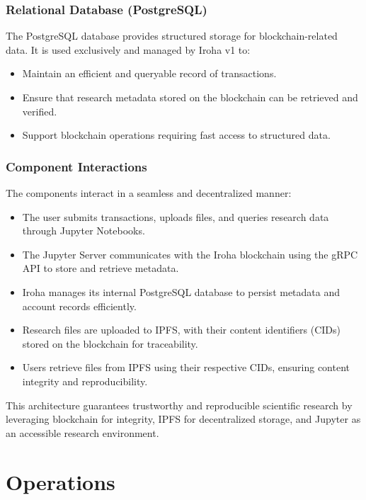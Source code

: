 \documentclass[final]{rc-book-2.14}
\begin{document}
\subsubsection{Relational Database (PostgreSQL)}
The PostgreSQL database provides structured storage for blockchain-related data. It is used exclusively and managed by Iroha v1 to:
\begin{itemize}
    \item Maintain an efficient and queryable record of transactions.
    \item Ensure that research metadata stored on the blockchain can be retrieved and verified.
    \item Support blockchain operations requiring fast access to structured data.
\end{itemize}


\subsubsection{Component Interactions}

The components interact in a seamless and decentralized manner:

\begin{itemize}
    \item The user submits transactions, uploads files, and queries research data through Jupyter Notebooks.
    \item The Jupyter Server communicates with the Iroha blockchain using the gRPC API to store and retrieve metadata.
    \item Iroha manages its internal PostgreSQL database to persist metadata and account records efficiently.
    \item Research files are uploaded to IPFS, with their content identifiers (CIDs) stored on the blockchain for traceability.
    \item Users retrieve files from IPFS using their respective CIDs, ensuring content integrity and reproducibility.
\end{itemize}

This architecture guarantees trustworthy and reproducible scientific research by leveraging blockchain for integrity, IPFS for decentralized storage, and Jupyter as an accessible research environment.



\section{Operations}
\label{chp:proposed_model:sec:operations}
\end{document}
